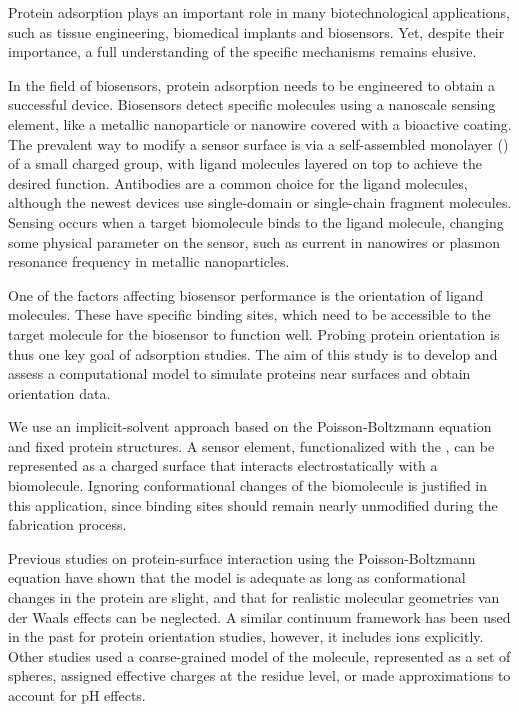 
Protein adsorption plays an important role in many biotechnological applications, such as tissue engineering, biomedical implants and biosensors.
Yet, despite their importance, a full understanding of the specific mechanisms remains elusive.\cite{Gray2004,RabeVerdesSeegel2011}

In the field of biosensors, protein adsorption needs to be engineered to obtain a successful device. 
Biosensors detect specific molecules using a nanoscale sensing element, like a metallic nanoparticle or nanowire covered with a bioactive coating. 
The prevalent way to modify a sensor surface is via a self-assembled monolayer (\sam) of a small charged group, with ligand molecules layered on top to achieve the desired function. 
Antibodies are a common choice for the ligand molecules, although the newest devices use single-domain or single-chain fragment molecules.\cite{ByunETal2013,TrillingETal2014} 
Sensing occurs when a target biomolecule binds to the ligand molecule,  changing some physical parameter on the sensor, such as current in nanowires or plasmon resonance frequency in metallic nanoparticles. 

One of the factors affecting biosensor performance is the orientation of ligand molecules.\cite{TajimaTakaiIshihara2011,TrillingBeekwilderZuilhof2013} 
These have specific binding sites, which need to be accessible to the target molecule for the biosensor to function well.
Probing protein orientation is thus one key goal of adsorption studies.
The aim of this study is to develop and assess a computational model to simulate proteins near surfaces and obtain orientation data.

We use an implicit-solvent approach based on the Poisson-Boltzmann equation and fixed protein structures. A sensor element, functionalized with the \sam, can be represented as a charged surface that interacts electrostatically with a biomolecule. Ignoring conformational changes of the biomolecule is justified in this application, since binding sites should remain nearly unmodified during the fabrication process.\cite{TajimaTakaiIshihara2011} 

Previous studies on protein-surface interaction using the Poisson-Boltzmann equation have shown that the model is adequate as long as conformational changes in the protein are slight,\cite{YaoLenhoff2004,YaoLenhoff2005} and that for realistic molecular geometries van der Waals effects can be neglected.\cite{RothNealLenhoff1996}
A similar continuum framework has been used in the past for protein orientation studies,\cite{JufferArgosDevlieg1996} however, it includes ions explicitly. Other studies used a coarse-grained model of the molecule, represented as  a set of spheres,\cite{ShengTsaoZhouJiang2002,ZhouTsaoShengJiang2004} assigned effective charges at the residue level,\cite{FreedCramer2011,ZhouChenJiang2003} or made approximations to account for pH effects.\cite{BiesheuvelvanderVeenNord2005,HartvigdeWeertOstergaartJorgensenJensen2011}

